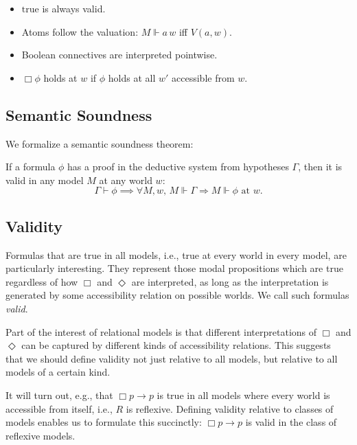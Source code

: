 \begin{definition}
  \label{def:example}
  \leanok
\begin{itemize}
  \item $\text{true}$ is always valid.
  \item Atoms follow the valuation: $M \Vdash a\, w$ iff $V(a, w)$.
  \item Boolean connectives are interpreted pointwise.
  \item $\Box \phi$ holds at $w$ if $\phi$ holds at all $w'$ accessible from $w$.
\end{itemize}
\end{definition}

\subsection{Semantic Soundness}

We formalize a semantic soundness theorem:

\begin{theorem}
    \label{thm:semantic-soundness}
  \leanok
If a formula $\phi$ has a proof in the deductive system from hypotheses $\Gamma$, then it is valid in any model $M$ at any world $w$:
\[
\Gamma \vdash \phi \implies \forall M, w,\, M \Vdash \Gamma \Rightarrow M \Vdash \phi \text{ at } w.
\]
\end{theorem}

\subsection{Validity}

Formulas that are true in all models, i.e., true at every world in 
every model, are particularly interesting. They represent those modal 
propositions which are true regardless of how $\Box$ and $\Diamond$ are 
interpreted, as long as the interpretation is generated by some accessibility 
relation on possible worlds. We call such formulas \emph{valid}.

Part of the interest of relational models is that different interpretations 
of $\Box$ and $\Diamond$ can be captured by different kinds of accessibility 
relations. This suggests that we should define validity not just relative to 
all models, but relative to all models of a certain kind.

It will turn out, e.g., that $\Box p \to p$ is true in all models where every 
world is accessible from itself, i.e., $R$ is reflexive. Defining validity 
relative to classes of models enables us to formulate this succinctly: 
$\Box p \to p$ is valid in the class of reflexive models.

